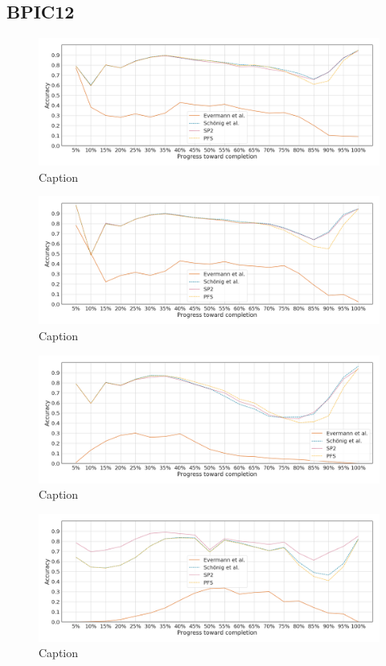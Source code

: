 \subsection{BPIC12}
\begin{figure}[!htb]
    \centering
    \includegraphics[width=\textwidth]{gfx/bpic2012/individual_stability.png}
    \caption{Caption}
    \label{fig:my_label}
\end{figure}
\begin{figure}[!htb]
    \centering
    \includegraphics[width=\textwidth]{gfx/bpic2012/grouped_stability.png}
    \caption{Caption}
    \label{fig:my_label}
\end{figure}
\begin{figure}[!htb]
    \centering
    \includegraphics[width=\textwidth]{gfx/bpic2012/padded_stability.png}
    \caption{Caption}
    \label{fig:my_label}
\end{figure}
\begin{figure}[!htb]
    \centering
    \includegraphics[width=\textwidth]{gfx/bpic2012/windowed_stability.png}
    \caption{Caption}
    \label{fig:my_label}
\end{figure}
\FloatBarrier


